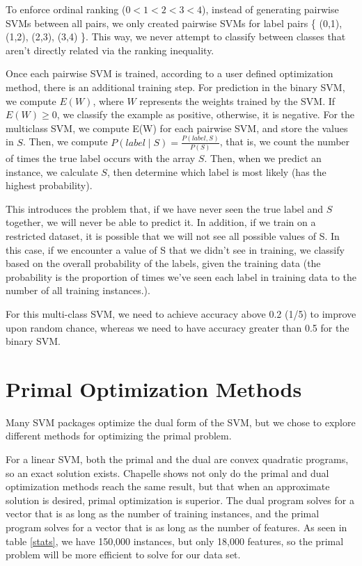 \documentclass[letterpaper, 11pt]{article}
\begin{document}
To enforce ordinal ranking ($0 < 1 < 2 < 3 < 4$), instead of generating pairwise SVMs between all pairs, we only created pairwise SVMs for label pairs \{ (0,1), (1,2), (2,3), (3,4) \}.  This way, we never attempt to classify between classes that aren't directly related via the ranking inequality.

Once each pairwise SVM is trained, according to a user defined optimization method, there is an additional training step.  For prediction in the binary SVM, we compute $E(W)$, where $W$ represents the weights trained by the SVM.  If $E(W) \ge 0$, we classify the example as positive, otherwise, it is negative.  For the multiclass SVM, we compute E(W) for each pairwise SVM, and store the values in $S$.  Then, we compute $P(label \mid S) = \frac{P(label, S)}{P(S)}$, that is, we count the number of times the true label occurs with the array $S$.  Then, when we predict an instance, we calculate $S$, then determine which label is most likely (has the highest probability).

This introduces the problem that, if we have never seen the true label and $S$ together, we will never be able to predict it.  In addition, if we train on a restricted dataset, it is possible that we will not see all possible values of S.  In this case, if we encounter a value of S that we didn't see in training, we classify based on the overall probability of the labels, given the training data (the probability is the proportion of times we've seen each label in training data to the number of all training instances.).

For this multi-class SVM, we need to achieve accuracy above 0.2 (1/5) to improve upon random chance, whereas we need to have accuracy greater than 0.5 for the binary SVM.

\section{Primal Optimization Methods}
Many SVM packages optimize the dual form of the SVM, but we chose to explore different methods for optimizing the primal problem.

For a linear SVM, both the primal and the dual are convex quadratic programs, so an exact solution exists.  Chapelle shows not only do  the primal and dual optimization methods reach the same result, but that when an approximate solution is desired, primal optimization is superior\cite{chapelle2007training}.  The  dual program solves for a vector that is as long as the number of training instances, and the primal program solves for a vector that is as long as the number of features.  As seen in table \ref{stats}, we have 150,000 instances, but only 18,000 features, so the primal problem will be more efficient to solve for our data set.
\end{document}
